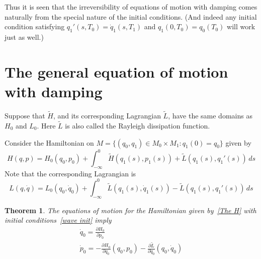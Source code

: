 \documentclass{amsart}
\newtheorem{thm}{Theorem}
\begin{document}
Thus it is seen that the irreversibility of equations of motion with damping comes naturally from the special nature of the initial conditions.  (And indeed any initial condition satisfying $q_1'(s,T_0) = \dot q_1(s,T_1)$ and $q_1(0,T_0) = q_0(T_0)$ will work just as well.)

\section{The general equation of motion with damping}

Suppose that $\tilde H$, and its corresponding Lagrangian $\tilde L$, have the same domains as $H_0$ and $L_0$.  Here $\tilde L$ is also called the Rayleigh dissipation function.

Consider the Hamiltonian on $M = \{ (q_0, q_1) \in M_0 \times M_1 : q_1(0) = q_0 \}$ given by
\begin{equation}
\label{The H}
H(q,p) = H_0(q_0,p_0) + \int_{-\infty}^0 \tilde H(q_1(s),p_1(s)) + \tilde L(q_1(s),q_1'(s)) \, ds
\end{equation}
Note that the corresponding Lagrangian is
\begin{equation}
L(q,\dot q) = L_0(q_0,\dot q_0) + \int_{-\infty}^0 \tilde L(q_1(s),\dot q_1(s)) - \tilde L(q_1(s),q_1'(s)) \, ds
\end{equation}

\begin{thm} The equations of motion for the Hamiltonian given by~\eqref{The H} with initial conditions~\eqref{wave init} imply
\begin{gather}
\dot q_0 = \frac{\partial H_0}{\partial p_0} \\
\dot p_0 = - \frac{\partial H_0}{\partial q_0}(q_0,p_0) - \frac{\partial \tilde L}{\partial \dot q_0}(q_0,\dot q_0)
\end{gather}
\end{thm}
\end{document}
